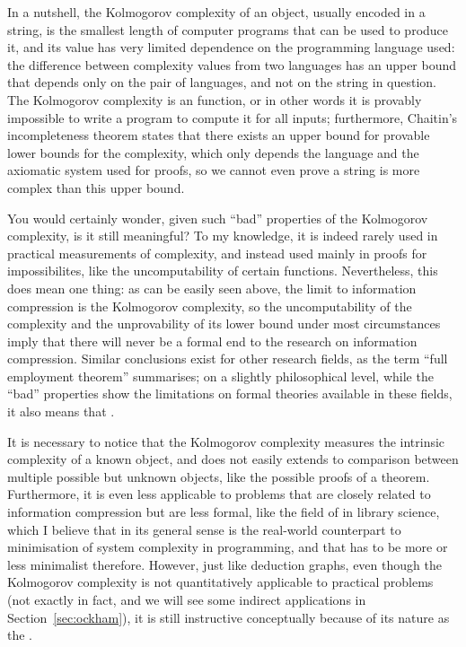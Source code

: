 In a nutshell, the Kolmogorov complexity of an object, usually encoded in a
string, is the smallest length of computer programs that can be used to produce
it, and its value has very limited dependence on the programming language used:
the difference between complexity values from two languages has an upper bound
that depends only on the pair of languages, and not on the string in question.
The Kolmogorov complexity is an  function, or in other
words it is provably impossible to write a program to compute it for all inputs;
furthermore, Chaitin's incompleteness theorem states that there exists an upper
bound for provable lower bounds for the complexity, which only depends the
language and the axiomatic system used for proofs, so we cannot even prove a
string is more complex than this upper bound.

You would certainly wonder, given such ``bad'' properties of the Kolmogorov
complexity, is it still meaningful?  To my knowledge, it is indeed rarely used
in practical measurements of complexity, and instead used mainly in proofs for
impossibilites, like the uncomputability of certain functions.  Nevertheless,
this does mean one thing: as can be easily seen above, the limit to information
compression is the Kolmogorov complexity, so the uncomputability of the
complexity and the unprovability of its lower bound under most circumstances
imply that there will never be a formal end to the research on information
compression.  Similar conclusions exist for other research fields, as
the term ``full employment theorem'' summarises;
on a slightly philosophical level, while the ``bad'' properties show the
limitations on formal theories available in these fields, it also means that
.

It is necessary to notice that the Kolmogorov complexity measures the intrinsic
complexity of a known object, and does not easily extends to comparison between
multiple possible but unknown objects, like the possible proofs of a theorem.
Furthermore, it is even less applicable to problems that are closely related to
information compression but are less formal, like the field of  in library science, which I believe that in its general sense is
the real-world counterpart to minimisation of system complexity in programming,
and that has to be more or less minimalist therefore.  However, just like
deduction graphs, even though the Kolmogorov complexity is not quantitatively
applicable to practical problems (not exactly in fact, and we will see some
indirect applications in Section~\ref{sec:ockham}), it is still instructive
conceptually because of its nature as the .

